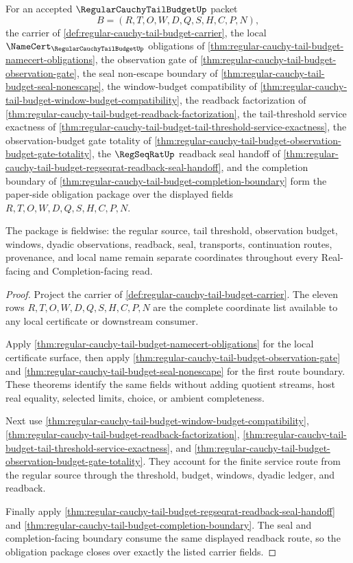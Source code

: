 \begin{theorem}
\label{thm:regular-cauchy-tail-budget-obligation-closure-package}
For an accepted $\RegularCauchyTailBudgetUp$ packet
$$
B=(R,T,O,W,D,Q,S,H,C,P,N),
$$
the carrier of \autoref{def:regular-cauchy-tail-budget-carrier}, the local $\NameCert_{\RegularCauchyTailBudgetUp}$ obligations of \autoref{thm:regular-cauchy-tail-budget-namecert-obligations}, the observation gate of \autoref{thm:regular-cauchy-tail-budget-observation-gate}, the seal non-escape boundary of \autoref{thm:regular-cauchy-tail-budget-seal-nonescape}, the window-budget compatibility of \autoref{thm:regular-cauchy-tail-budget-window-budget-compatibility}, the readback factorization of \autoref{thm:regular-cauchy-tail-budget-readback-factorization}, the tail-threshold service exactness of \autoref{thm:regular-cauchy-tail-budget-tail-threshold-service-exactness}, the observation-budget gate totality of \autoref{thm:regular-cauchy-tail-budget-observation-budget-gate-totality}, the $\RegSeqRatUp$ readback seal handoff of \autoref{thm:regular-cauchy-tail-budget-regseqrat-readback-seal-handoff}, and the completion boundary of \autoref{thm:regular-cauchy-tail-budget-completion-boundary} form the paper-side obligation package over the displayed fields $R,T,O,W,D,Q,S,H,C,P,N$.

The package is fieldwise: the regular source, tail threshold, observation budget, windows, dyadic observations, readback, seal, transports, continuation routes, provenance, and local name remain separate coordinates throughout every Real-facing and Completion-facing read.
\end{theorem}
\begin{proof}
Project the carrier of \autoref{def:regular-cauchy-tail-budget-carrier}. The eleven rows $R,T,O,W,D,Q,S,H,C,P,N$ are the complete coordinate list available to any local certificate or downstream consumer.

Apply \autoref{thm:regular-cauchy-tail-budget-namecert-obligations} for the local certificate surface, then apply \autoref{thm:regular-cauchy-tail-budget-observation-gate} and \autoref{thm:regular-cauchy-tail-budget-seal-nonescape} for the first route boundary. These theorems identify the same fields without adding quotient streams, host real equality, selected limits, choice, or ambient completeness.

Next use \autoref{thm:regular-cauchy-tail-budget-window-budget-compatibility}, \autoref{thm:regular-cauchy-tail-budget-readback-factorization}, \autoref{thm:regular-cauchy-tail-budget-tail-threshold-service-exactness}, and \autoref{thm:regular-cauchy-tail-budget-observation-budget-gate-totality}. They account for the finite service route from the regular source through the threshold, budget, windows, dyadic ledger, and readback.

Finally apply \autoref{thm:regular-cauchy-tail-budget-regseqrat-readback-seal-handoff} and \autoref{thm:regular-cauchy-tail-budget-completion-boundary}. The seal and completion-facing boundary consume the same displayed readback route, so the obligation package closes over exactly the listed carrier fields.
\end{proof}

